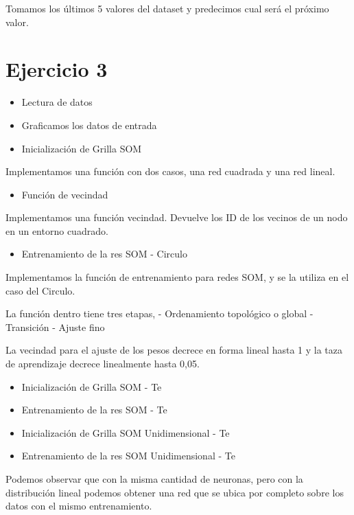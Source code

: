 \documentclass[]{book}
\providecommand{\tightlist}{%
  \setlength{\itemsep}{0pt}\setlength{\parskip}{0pt}}
\begin{document}
Tomamos los últimos 5 valores del dataset y predecimos cual será el próximo valor.

\hypertarget{ejercicio-3-1}{%
\section{Ejercicio 3}\label{ejercicio-3-1}}

\begin{itemize}
\item
  Lectura de datos
\item
  Graficamos los datos de entrada
\item
  Inicialización de Grilla SOM
\end{itemize}

Implementamos una función con dos casos, una red cuadrada y una red lineal.

\begin{itemize}
\tightlist
\item
  Función de vecindad
\end{itemize}

Implementamos una función vecindad. Devuelve los ID de los vecinos de un nodo en un entorno cuadrado.

\begin{itemize}
\tightlist
\item
  Entrenamiento de la res SOM - Circulo
\end{itemize}

Implementamos la función de entrenamiento para redes SOM, y se la utiliza en el caso del Circulo.

La función dentro tiene tres etapas,
- Ordenamiento topológico o global
- Transición
- Ajuste fino

La vecindad para el ajuste de los pesos decrece en forma lineal hasta 1 y la taza de aprendizaje decrece linealmente hasta 0,05.

\begin{itemize}
\item
  Inicialización de Grilla SOM - Te
\item
  Entrenamiento de la res SOM - Te
\item
  Inicialización de Grilla SOM Unidimensional - Te
\item
  Entrenamiento de la res SOM Unidimensional - Te
\end{itemize}

Podemos observar que con la misma cantidad de neuronas, pero con la distribución lineal podemos obtener una red que se ubica por completo sobre los datos con el mismo entrenamiento.
\end{document}
